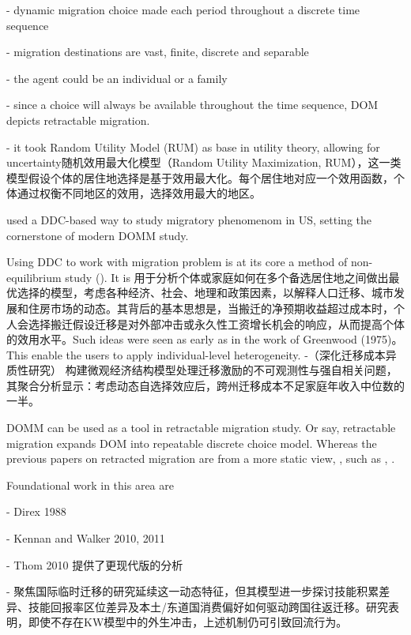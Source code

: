 \documentclass[a4paper,12pt]{article}
\begin{document}
- dynamic migration choice made each period throughout a discrete time sequence

- migration destinations are vast, finite, discrete and separable

- the agent could be an individual or a family

- since a choice will always be available throughout the time sequence, DOM depicts retractable migration.

- it took Random Utility Model (RUM) as base in utility theory, allowing for uncertainty随机效用最大化模型（Random Utility Maximization, RUM），这一类模型假设个体的居住地选择是基于效用最大化。每个居住地对应一个效用函数，个体通过权衡不同地区的效用，选择效用最大的地区。


\cite{kennanEffectExpectedIncome2011} used a DDC-based way to study migratory phenomenom in US, setting the cornerstone of modern DOMM study.

Using DDC to work with migration problem is at its core a method of non-equilibrium study (\cite{jiaEconomicsInternalMigration2023}). 
It is 用于分析个体或家庭如何在多个备选居住地之间做出最优选择的模型，考虑各种经济、社会、地理和政策因素，以解释人口迁移、城市发展和住房市场的动态。其背后的基本思想是，当搬迁的净预期收益超过成本时，个人会选择搬迁假设迁移是对外部冲击或永久性工资增长机会的响应，从而提高个体的效用水平。Such ideas were seen as early as in the work of Greenwood (1975)。This enable the users to apply individual-level heterogeneity.
-（深化迁移成本异质性研究）
\cite{bayerDynamicsInterstateMigration2012}构建微观经济结构模型处理迁移激励的不可观测性与强自相关问题，其聚合分析显示：考虑动态自选择效应后，跨州迁移成本不足家庭年收入中位数的一半。



DOMM can be used as a tool in retractable migration study. Or say, retractable migration expands DOM into repeatable discrete choice model. Whereas the previous papers on retracted migration are from a more static view, , such as \cite{RenYuanNongCunWaiChuLaoDongLiHuiLiuQianYiDeYingXiangYinSuHeHuiLiuXiaoYing2017}, \cite{ShiZhiLeiJiaTingBingFuJiaTingJueCeYuNongCunQianYiLaoDongLiHuiLiu2012}.

Foundational work in this area are

- Direx 1988

- Kennan and Walker 2010, 2011

- Thom 2010 提供了更现代版的分析

- \cite{dustmannEconomicsTemporaryMigrations2016}聚焦国际临时迁移的研究延续这一动态特征，但其模型进一步探讨技能积累差异、技能回报率区位差异及本土/东道国消费偏好如何驱动跨国往返迁移。研究表明，即使不存在KW模型中的外生冲击，上述机制仍可引致回流行为。
\end{document}
